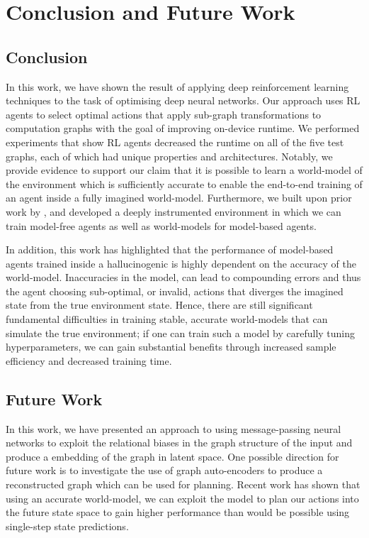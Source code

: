 \chapter{Conclusion and Future Work}

\section{Conclusion}

In this work, we have shown the result of applying deep reinforcement learning techniques to the task of optimising deep neural networks. Our approach uses RL agents to select optimal actions that apply sub-graph transformations to computation graphs with the goal of improving on-device runtime. We performed experiments that show RL agents decreased the runtime on all of the five test graphs, each of which had unique properties and architectures. Notably, we provide evidence to support our claim that it is possible to learn a world-model of the environment which is sufficiently accurate to enable the end-to-end training of an agent inside a fully imagined world-model. Furthermore, we built upon prior work by \citet{jia2019taso}, and developed a deeply instrumented environment in which we can train model-free agents as well as world-models for model-based agents.

In addition, this work has highlighted that the performance of model-based agents trained inside a hallucinogenic is highly dependent on the accuracy of the world-model. Inaccuracies in the model, can lead to compounding errors and thus the agent choosing sub-optimal, or invalid, actions that diverges the imagined state from the true environment state. Hence, there are still significant fundamental difficulties in training stable, accurate world-models that can simulate the true environment; if one can train such a model by carefully tuning hyperparameters, we can gain substantial benefits through increased sample efficiency and decreased training time.

\section{Future Work}


In this work, we have presented an approach to using message-passing neural networks to exploit the relational biases in the graph structure of the input and produce a embedding of the graph in latent space. One possible direction for future work is to investigate the use of graph auto-encoders \cite{battaglia2018relational} to produce a reconstructed graph which can be used for planning. Recent work \cite{hafner2018learning, sekar2020planning} has shown that using an accurate world-model, we can exploit the model to plan our actions into the future state space to gain higher performance than would be possible using single-step state predictions.

